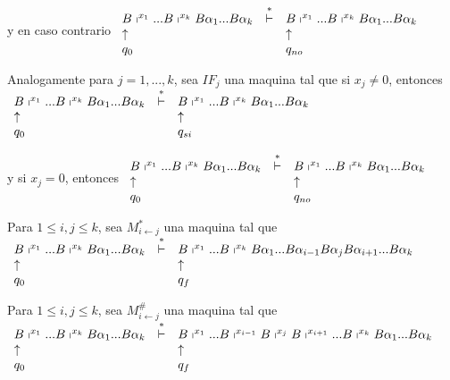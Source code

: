   y en caso contrario
  $\displaystyle \begin{array}{lcl} B\shortmid ^{x_{1}}...B\shortmid ^{x_{k}}B\alpha _{1}...B\alpha _{k} & \overset{\ast }{\vdash } & B\shortmid ^{x_{1}}...B\shortmid ^{x_{k}}B\alpha _{1}...B\alpha _{k} \\ \uparrow & & \uparrow \\ q_{0} & & q_{no} \end{array} $

  Analogamente para $j=1,...,k$, sea $IF_{j}$ una maquina tal que si $ x_{j}\neq 0$, entonces
  $\displaystyle \begin{array}{lcl} B\shortmid ^{x_{1}}...B\shortmid ^{x_{k}}B\alpha _{1}...B\alpha _{k} & \overset{\ast }{\vdash } & B\shortmid ^{x_{1}}...B\shortmid ^{x_{k}}B\alpha _{1}...B\alpha _{k} \\ \uparrow & & \uparrow \\ q_{0} & & q_{si} \end{array} $

  y si $x_{j}=0$, entonces
  $\displaystyle \begin{array}{lcl} B\shortmid ^{x_{1}}...B\shortmid ^{x_{k}}B\alpha _{1}...B\alpha _{k} & \overset{\ast }{\vdash } & B\shortmid ^{x_{1}}...B\shortmid ^{x_{k}}B\alpha _{1}...B\alpha _{k} \\ \uparrow & & \uparrow \\ q_{0} & & q_{no} \end{array} $

  Para $1\leq i,j\leq k$, sea $M_{i\leftarrow j}^{\ast }$ una maquina tal que
  $\displaystyle \begin{array}{lcl} B\shortmid ^{x_{1}}...B\shortmid ^{x_{k}}B\alpha _{1}...B\alpha _{k} & \overset{\ast }{\vdash } & B\shortmid ^{x_{1}}...B\shortmid ^{x_{k}}B\alpha _{1}...B\alpha _{i-1}B\alpha _{j}B\alpha _{i+1}...B\alpha _{k} \\ \uparrow & & \uparrow \\ q_{0} & & q_{f} \end{array} $

  Para $1\leq i,j\leq k$, sea $M_{i\leftarrow j}^{\#}$ una maquina tal que
  $\displaystyle \begin{array}{lcl} B\shortmid ^{x_{1}}...B\shortmid ^{x_{k}}B\alpha _{1}...B\alpha _{k} & \overset{\ast }{\vdash } & B\shortmid ^{x_{1}}...B\shortmid ^{x_{i-1}}B\shortmid ^{x_{j}}B\shortmid ^{x_{i+1}}...B\shortmid ^{x_{k}}B\alpha _{1}...B\alpha _{k} \\ \uparrow & & \uparrow \\ q_{0} & & q_{f} \end{array} $

